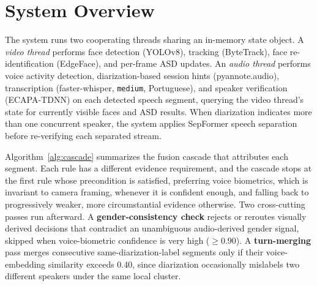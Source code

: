 \documentclass[conference,a4paper]{IEEEtran}
\begin{document}
\section{System Overview}
\label{sec:system}

The system runs two cooperating threads sharing an in-memory state
object. A \emph{video thread} performs face detection (YOLOv8),
tracking (ByteTrack), face re-identification (EdgeFace), and per-frame
ASD updates. An \emph{audio thread} performs voice activity detection,
diarization-based session hints (pyannote.audio), transcription
(faster-whisper, \texttt{medium}, Portuguese), and speaker verification
(ECAPA-TDNN) on each detected speech segment, querying the video
thread's state for currently visible faces and ASD results. When
diarization indicates more than one concurrent speaker, the system
applies SepFormer \cite{subakan2021sepformer} speech separation before
re-verifying each separated stream.

Algorithm~\ref{alg:cascade} summarizes the fusion cascade that
attributes each segment. Each rule has a different evidence
requirement, and the cascade stops at the first rule whose precondition
is satisfied, preferring voice biometrics, which is invariant to camera
framing, whenever it is confident enough, and falling back to
progressively weaker, more circumstantial evidence otherwise. Two
cross-cutting passes run afterward. A \textbf{gender-consistency check}
rejects or reroutes visually derived decisions that contradict an
unambiguous audio-derived gender signal, skipped when voice-biometric
confidence is very high ($\geq 0.90$). A \textbf{turn-merging} pass
merges consecutive same-diarization-label segments only if their
voice-embedding similarity exceeds 0.40, since diarization occasionally
mislabels two different speakers under the same local cluster.
\end{document}
